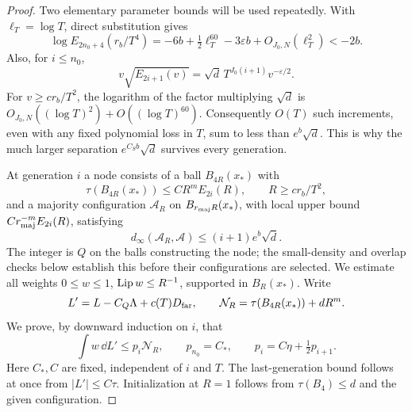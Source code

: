 \begin{proof}
Two elementary parameter bounds will be used repeatedly.  With
$\ell_T=\log T$, direct substitution gives
\begin{equation}\label{ct:small-envelope}
 \log E_{2n_0+4}(r_b/T^4)
 =-6b+\tfrac12\ell_T^{60}-3\varepsilon b
       +O_{J_0,N}(\ell_T^2)
 <-2b.
\end{equation}
Also, for $i\le n_0$,
\begin{equation}\label{ct:motion-budget}
 v\sqrt{E_{2i+1}(v)}
 =\sqrt d\,T^{J_0(i+1)}v^{-\varepsilon/2}.
\end{equation}
For $v\ge cr_b/T^2$, the logarithm of the factor multiplying $\sqrt d$
is $O_{J_0,N}((\log T)^2)+O((\log T)^{60})$.  Consequently $O(T)$
such increments, even with any fixed polynomial loss in $T$, sum to
less than $e^b\sqrt d$.  This is why the much larger separation
$e^{C_Sb}\sqrt d$ survives every generation.

At generation $i$ a node consists of a ball $B_{4R}(x_*)$ with
\begin{equation}\label{ct:node-hypotheses}
 \tau(B_{4R}(x_*))\le C R^mE_{2i}(R),\qquad
 R\ge cr_b/T^2,
\end{equation}
and a majority configuration $\mathcal A_R$ on
$B_{r_{\rm maj}R}(x_*)$, with local upper bound
$C r_{\rm maj}^{-m}E_{2i}(R)$, satisfying
\[
 d_\infty(\mathcal A_R,\mathcal A)\le(i+1)e^b\sqrt d.
\]
The integer is $Q$ on the balls constructing the node; the small-density
and overlap checks below establish this before their configurations are
selected. We estimate all weights
$0\le w\le1$, $\operatorname{Lip} w\le R^{-1}$, supported in $B_R(x_*)$.
Write
\[
 L'=L-C_Q\Lambda+c(T)D_{\rm far},\qquad
 \mathcal N_R=\tau(B_{4R}(x_*))+dR^m.
\]
We prove, by downward induction on $i$, that
\begin{equation}\label{ct:node-conclusion}
 \int w\,\dd L'\le p_i\mathcal N_R,
 \qquad p_{n_0}=C_*,\qquad
 p_i=C\eta+\tfrac12p_{i+1}.
\end{equation}
Here $C_*,C$ are fixed, independent of $i$ and $T$.  The last-generation
bound follows at once from $|L'|\le C\tau$.  Initialization at $R=1$
follows from $\tau(B_4)\le d$ and the given configuration.


\end{proof}
